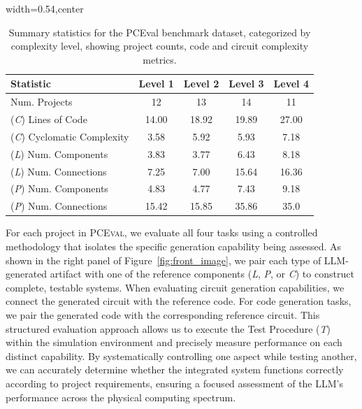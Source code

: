 \documentclass{article} %
\begin{document}
\begin{table}
\vspace{-1.2em}
\caption{Summary statistics for the PCEval benchmark dataset, categorized by complexity level, showing project counts, code and circuit complexity metrics.}
\label{tab:dataset_summary_stats}
\centering
\small
\begin{adjustbox}{width=0.54\columnwidth,center}
\begin{tabular}{@{}l cccc @{}}
\toprule
\textbf{Statistic} & \textbf{Level 1} & \textbf{Level 2} & \textbf{Level 3} & \textbf{Level 4} \\
\midrule
Num. Projects & 12 & 13 & 14 & 11 \\
\midrule
(\textit{C}) Lines of Code & 14.00 & 18.92 & 19.89 & 27.00 \\
(\textit{C}) Cyclomatic Complexity & 3.58 & 5.92 & 5.93 & 7.18 \\
\midrule
(\textit{L}) Num. Components & 3.83 & 3.77 & 6.43 & 8.18 \\
(\textit{L}) Num. Connections & 7.25 & 7.00 & 15.64 & 16.36 \\
\midrule
(\textit{P}) Num. Components & 4.83 & 4.77 & 7.43 & 9.18 \\
(\textit{P}) Num. Connections & 15.42 & 15.85 & 35.86 & 35.0 \\
\bottomrule
\end{tabular}
\end{adjustbox}
\end{table}

For each project in \textsc{PCEval}, we evaluate all four tasks using a controlled methodology that isolates the specific generation capability being assessed.
As shown in the right panel of Figure~\ref{fig:front_image}, we pair each type of LLM-generated artifact with one of the reference components (\textit{L}, \textit{P}, or \textit{C}) to construct complete, testable systems.
When evaluating circuit generation capabilities, we connect the generated circuit with the reference code.
For code generation tasks, we pair the generated code with the corresponding reference circuit.
This structured evaluation approach allows us to execute the Test Procedure (\textit{T}) within the simulation environment \citep{shaked2020wokwi} and precisely measure performance on each distinct capability.
By systematically controlling one aspect while testing another, we can accurately determine whether the integrated system functions correctly according to project requirements, ensuring a focused assessment of the LLM's performance across the physical computing spectrum.
\end{document}

